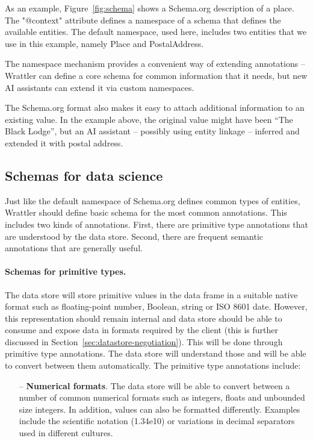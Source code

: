 \documentclass[sigplan,preprint,10pt]{acmart}\settopmatter{printfolios=true,printccs=false,printacmref=false}
\newcommand{\str}[1]{\textnormal{\textcolor{strclr}{\sffamily "#1"}}}
\begin{document}
{As an example, Figure~\ref{fig:schema} shows a Schema.org description of a place.
The \str{@context} attribute defines a namespace of a schema that defines the available
entities. The default namespace, used here, includes two entities that we use in this 
example, namely Place and PostalAddress.

The namespace mechanism provides a convenient way of extending annotations -- Wrattler can
define a core schema for common information that it needs, but new AI assistants can 
extend it via custom namespaces.

The Schema.org format also makes it easy to attach additional information to an existing
value. In the example above, the original value might have been ``The Black Lodge'', but 
an AI assistant -- possibly using entity linkage -- inferred and extended it with postal address.

\subsection{Schemas for data science}
\label{sec:datastore-schema}

Just like the default namespace of Schema.org defines common types of entities, Wrattler
should define basic schema for the most common annotations. This includes two kinds of annotations.
First, there are primitive type annotations that are understood by the data store. Second,
there are frequent semantic annotations that are generally useful. 

\paragraph{Schemas for primitive types.} The data store will store primitive values in the
data frame in a suitable native format such as floating-point number, Boolean, string or 
ISO 8601 date. However, this representation should remain internal and data store should be
able to consume and expose data in formats required by the client (this is further discussed
in Section~\ref{sec:datastore-negotiation}). This will be done through primitive type annotations.
The data store will understand those and will be able to convert between them automatically.
The primitive type annotations include:
%
\begin{itemize}
\item[--] \textbf{Numerical formats}. The data store will be able to convert between a number of common numerical
  formats such as integers, floats and unbounded size integers. In addition, values can also be
  formatted differently. Examples include the scientific notation (1.34e10) or variations in 
  decimal separators used in different cultures.
  

\end{itemize}}
\end{document}
